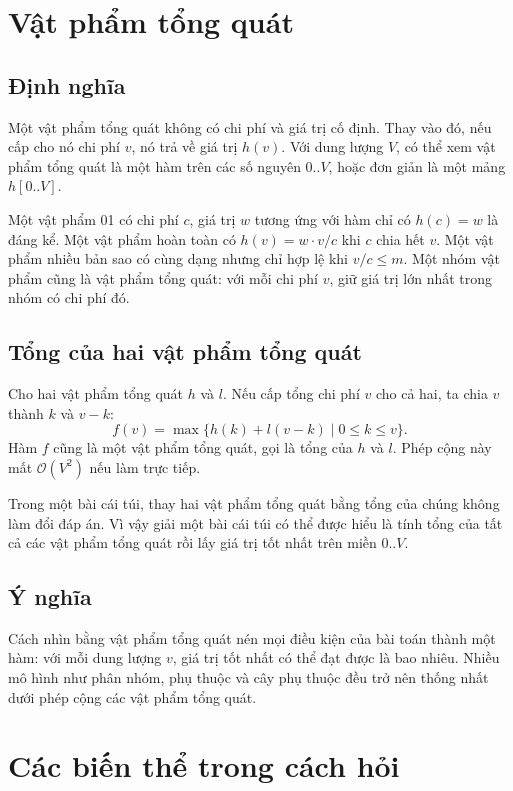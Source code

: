 \documentclass[11pt]{article}
\newcommand{\Oh}{\mathcal{O}}
\begin{document}
\section{Vật phẩm tổng quát}

\subsection{Định nghĩa}

Một vật phẩm tổng quát không có chi phí và giá trị cố định. Thay vào đó, nếu
cấp cho nó chi phí \(v\), nó trả về giá trị \(h(v)\). Với dung lượng \(V\), có
thể xem vật phẩm tổng quát là một hàm trên các số nguyên \(0..V\), hoặc đơn
giản là một mảng \(h[0..V]\).

Một vật phẩm 01 có chi phí \(c\), giá trị \(w\) tương ứng với hàm chỉ có
\(h(c)=w\) là đáng kể. Một vật phẩm hoàn toàn có \(h(v)=w\cdot v/c\) khi
\(c\) chia hết \(v\). Một vật phẩm nhiều bản sao có cùng dạng nhưng chỉ hợp lệ
khi \(v/c\le m\). Một nhóm vật phẩm cũng là vật phẩm tổng quát: với mỗi chi
phí \(v\), giữ giá trị lớn nhất trong nhóm có chi phí đó.

\subsection{Tổng của hai vật phẩm tổng quát}

Cho hai vật phẩm tổng quát \(h\) và \(l\). Nếu cấp tổng chi phí \(v\) cho cả
hai, ta chia \(v\) thành \(k\) và \(v-k\):
\[
  f(v)=\max\{h(k)+l(v-k)\mid 0\le k\le v\}.
\]
Hàm \(f\) cũng là một vật phẩm tổng quát, gọi là tổng của \(h\) và \(l\).
Phép cộng này mất \(\Oh(V^2)\) nếu làm trực tiếp.

Trong một bài cái túi, thay hai vật phẩm tổng quát bằng tổng của chúng không
làm đổi đáp án. Vì vậy giải một bài cái túi có thể được hiểu là tính tổng của
tất cả các vật phẩm tổng quát rồi lấy giá trị tốt nhất trên miền \(0..V\).

\subsection{Ý nghĩa}

Cách nhìn bằng vật phẩm tổng quát nén mọi điều kiện của bài toán thành một
hàm: với mỗi dung lượng \(v\), giá trị tốt nhất có thể đạt được là bao nhiêu.
Nhiều mô hình như phân nhóm, phụ thuộc và cây phụ thuộc đều trở nên thống nhất
dưới phép cộng các vật phẩm tổng quát.

\section{Các biến thể trong cách hỏi}
\end{document}
